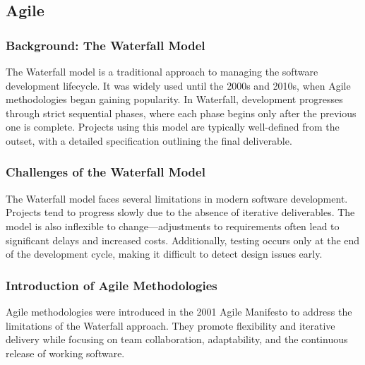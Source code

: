 \documentclass{article}
\begin{document}
\subsection{Agile}

\subsubsection{Background: The Waterfall Model}
The Waterfall model is a traditional approach to managing the software development lifecycle. It was widely used until the 2000s and 2010s, when Agile methodologies began gaining popularity. In Waterfall, development progresses through strict sequential phases, where each phase begins only after the previous one is complete. Projects using this model are typically well-defined from the outset, with a detailed specification outlining the final deliverable.

\begin{center}
\end{center}


\subsubsection*{Challenges of the Waterfall Model}
The Waterfall model faces several limitations in modern software development. Projects tend to progress slowly due to the absence of iterative deliverables. The model is also inflexible to change—adjustments to requirements often lead to significant delays and increased costs. Additionally, testing occurs only at the end of the development cycle, making it difficult to detect design issues early.

\subsubsection{Introduction of Agile Methodologies}
Agile methodologies were introduced in the 2001 Agile Manifesto to address the limitations of the Waterfall approach. They promote flexibility and iterative delivery while focusing on team collaboration, adaptability, and the continuous release of working software.
\end{document}
